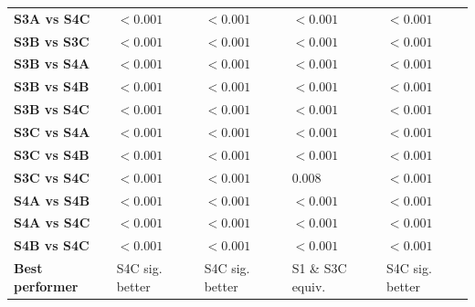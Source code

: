 \begin{table}[H]
{\begin{tabular}{lllll}
        \textbf{S3A vs S4C} & $< 0.001$ & $< 0.001$ & $< 0.001$ & $< 0.001$ \\
        \textbf{S3B vs S3C} & $< 0.001$ & $< 0.001$ & $< 0.001$ & $< 0.001$ \\
        \textbf{S3B vs S4A} & $< 0.001$ & $< 0.001$ & $< 0.001$ & $< 0.001$ \\
        \textbf{S3B vs S4B} & $< 0.001$ & $< 0.001$ & $< 0.001$ & $< 0.001$ \\
        \textbf{S3B vs S4C} & $< 0.001$ & $< 0.001$ & $< 0.001$ & $< 0.001$ \\
        \textbf{S3C vs S4A} & $< 0.001$ & $< 0.001$ & $< 0.001$ & $< 0.001$ \\
        \textbf{S3C vs S4B} & $< 0.001$ & $< 0.001$ & $< 0.001$ & $< 0.001$ \\
        \textbf{S3C vs S4C} & $< 0.001$ & $< 0.001$ & 0.008 & $< 0.001$ \\
        \textbf{S4A vs S4B} & $< 0.001$ & $< 0.001$ & $< 0.001$ & $< 0.001$ \\
        \textbf{S4A vs S4C} & $< 0.001$ & $< 0.001$ & $< 0.001$ & $< 0.001$ \\
        \textbf{S4B vs S4C} & $< 0.001$ & $< 0.001$ & $< 0.001$ & $< 0.001$ \\
        \textbf{Best performer} & S4C sig. better & S4C sig. better & S1 \& S3C equiv. & S4C sig. better \\
        \bottomrule
    \end{tabular}}
\end{table}